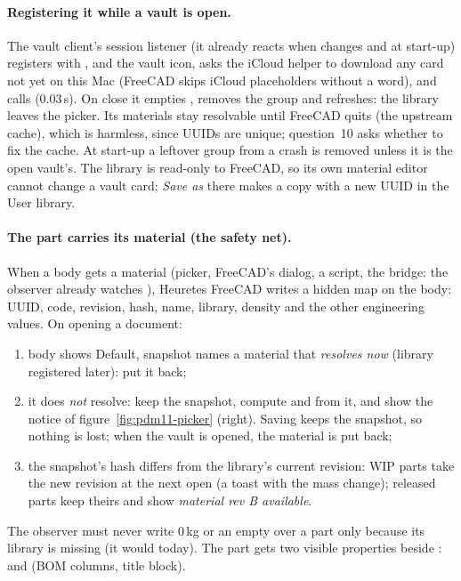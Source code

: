 \paragraph{Registering it while a vault is open.} The vault client's session listener (it already reacts when
 changes and at start-up) registers  with
,  and the vault icon, asks the iCloud helper to download
any card not yet on this Mac (FreeCAD skips iCloud placeholders without a word), and calls  (0.03\,s). On
close it empties , removes the group and refreshes: the library leaves the picker. Its materials stay
resolvable until FreeCAD quits (the upstream cache), which is harmless, since UUIDs are unique; question~10 asks whether to
fix the cache. At start-up a leftover  group from a crash is removed unless it is the open vault's. The
library is read-only to FreeCAD, so its own material editor cannot change a vault card; \emph{Save as} there makes a copy
with a new UUID in the User library.

\paragraph{The part carries its material (the safety net).} When a body gets a material (picker, FreeCAD's dialog, a
script, the bridge: the  observer already watches ), Heuretes FreeCAD writes a hidden map
 on the body: UUID, code, revision, hash, name, library, density and the other engineering
values. On opening a document:
\begin{enumerate}[nosep]
  \item body shows Default, snapshot names a material that \emph{resolves now} (library registered later): put it back;
  \item it does \emph{not} resolve: keep the snapshot, compute  and  from it, and show the
        notice of figure~\ref{fig:pdm11-picker} (right). Saving keeps the snapshot, so nothing is lost; when the vault is
        opened, the material is put back;
  \item the snapshot's hash differs from the library's current revision: WIP parts take the new revision at the next open
        (a toast with the mass change); released parts keep theirs and show \emph{material rev B available}.
\end{enumerate}
The observer must never write 0\,kg or an empty  over a part only because its library is missing (it
would today). The part gets two visible properties beside :  and
 (BOM columns, title block).

